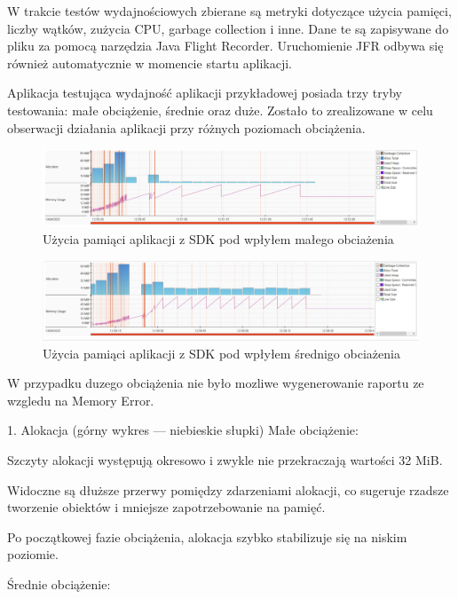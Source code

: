 \documentclass[runningheads,12pt]{llncs}
\begin{document}
W trakcie testów wydajnościowych zbierane są metryki dotyczące użycia pamięci, liczby wątków, zużycia CPU, garbage collection i inne. Dane te są zapisywane do pliku za pomocą narzędzia Java Flight Recorder. Uruchomienie JFR odbywa się również automatycznie w momencie startu aplikacji.

Aplikacja testująca wydajność aplikacji przykładowej posiada trzy tryby testowania: małe obciążenie, średnie oraz duże. Zostało to zrealizowane w celu obserwacji działania aplikacji przy różnych poziomach obciążenia.

\newpage

\begin{figure}
    \includegraphics[width=\linewidth]{images/library-memory-low-graph.jpg}
    \caption{Użycia pamiąci aplikacji z SDK pod wpłyłem małego obciażenia} \label{fig1}
\end{figure}

\begin{figure}
    \includegraphics[width=\linewidth]{images/library-memory-midle-graph.jpg}
    \caption{Użycia pamiąci aplikacji z SDK pod wpłyłem średnigo obciażenia} \label{fig1}
\end{figure}

W przypadku duzego obciążenia nie było mozliwe wygenerowanie raportu ze wzgledu na Memory Error.

1. Alokacja (górny wykres — niebieskie słupki)
Małe obciążenie:

Szczyty alokacji występują okresowo i zwykle nie przekraczają wartości 32 MiB.

Widoczne są dłuższe przerwy pomiędzy zdarzeniami alokacji, co sugeruje rzadsze tworzenie obiektów i mniejsze zapotrzebowanie na pamięć.

Po początkowej fazie obciążenia, alokacja szybko stabilizuje się na niskim poziomie.

Średnie obciążenie:
\end{document}

